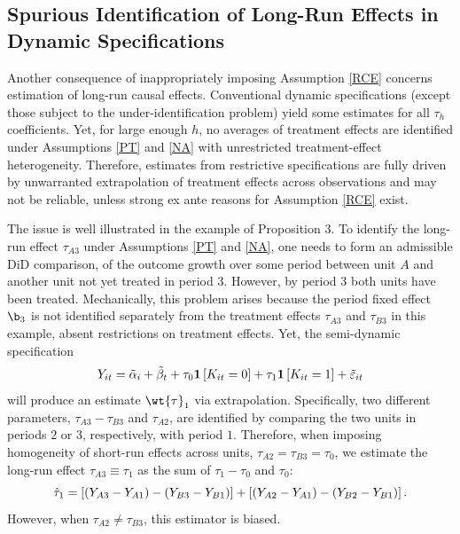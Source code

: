 \documentclass[12pt]{article}
\theoremstyle{definition}
\begin{document}
\subsection{Spurious Identification of Long-Run Effects in Dynamic Specifications}

Another consequence of inappropriately imposing Assumption \ref{RCE} concerns estimation of long-run causal effects. Conventional dynamic specifications (except those subject to the under-identification problem) yield some estimates for all $\tau_h$ coefficients. Yet, for large enough $h$, no averages of treatment effects are identified under Assumptions \ref{PT} and \ref{NA} with unrestricted treatment-effect heterogeneity. Therefore, estimates from restrictive specifications are fully driven by unwarranted extrapolation of treatment effects across observations and may not be reliable, unless strong ex ante reasons for Assumption \ref{RCE} exist.

The issue is well illustrated in the example of Proposition 3. To identify the long-run effect $\tau_{A3}$ under Assumptions \ref{PT} and \ref{NA}, one needs to form an admissible DiD comparison, of the outcome growth over some period between unit $A$ and another unit not yet treated in period $3$. However, by period $3$ both units have been treated. Mechanically, this problem arises because the period fixed effect $\b_3$ is not identified separately from the treatment effects $\tau_{A3}$ and $\tau_{B3}$ in this example, absent restrictions on treatment effects. Yet, the semi-dynamic specification 
\begin{equation}
    \notag 
    Y_{i t}=\tilde{\alpha}_i+\tilde{\beta}_t+\tau_0 \mathbf{1}\left[K_{i t}=0\right]+\tau_1 \mathbf{1}\left[K_{i t}=1\right]+\tilde{\varepsilon}_{i t}
\end{equation}
will produce an estimate $\wt{\tau}_1$ via extrapolation. Specifically, two different parameters, $\tau_{A3} - \tau_{B3}$ and $\tau_{A2}$, are identified by comparing the two units in periods $2$ or $3$, respectively, with period $1$. Therefore, when imposing homogeneity of short-run effects across units, $\tau_{A2} = \tau_{B3} = \tau_0$, we estimate the long-run effect $\tau_{A3} \equiv \tau_1$ as the sum of $\tau_1 - \tau_0$ and $\tau_0$:
\begin{equation}
    \notag 
    \hat{\tau}_1=\left[\left(Y_{A 3}-Y_{A 1}\right)-\left(Y_{B 3}-Y_{B 1}\right)\right]+\left[\left(Y_{A 2}-Y_{A 1}\right)-\left(Y_{B 2}-Y_{B 1}\right)\right] .
\end{equation}
However, when $\tau_{A2} \neq \tau_{B3}$, this estimator is biased. 
\end{document}

